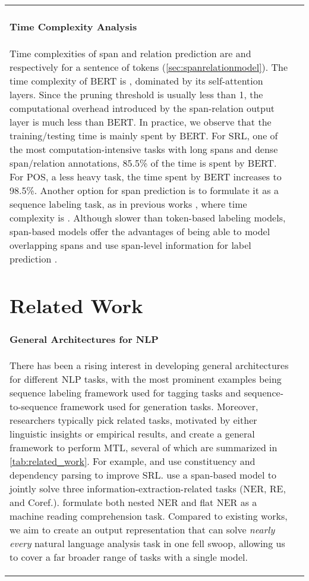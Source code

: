 \documentclass[11pt,a4paper]{article}
\begin{document}
\begin{table*}[tb]
\begin{subtable}[t]{0.47\textwidth}
{\begin{tabular}[t]{ll}
\paragraph{Time Complexity Analysis}
Time complexities of span and relation prediction are  and  respectively for a sentence of  tokens (\autoref{sec:spanrelationmodel}).
The time complexity of BERT is , dominated by its  self-attention layers.
Since the pruning threshold  is usually less than 1, the computational overhead introduced by the span-relation output layer is much less than BERT.
In practice, we observe that the training/testing time is mainly spent by BERT. For SRL, one of the most computation-intensive tasks with long spans and dense span/relation annotations, 85.5\% of the time is spent by BERT. For POS, a less heavy task, the time spent by BERT increases to 98.5\%.
Another option for span prediction is to formulate it as a sequence labeling task, as in previous works \citep{lample:16:ner,he-etal-2017-deep}, where time complexity is . Although slower than token-based labeling models, span-based models offer the advantages of being able to model overlapping spans and use span-level information for label prediction \citep{lee:17:e2ecoref}.

\section{Related Work}\label{sec:related}

\paragraph{General Architectures for NLP}
There has been a rising interest in developing general architectures for different NLP tasks, with the most prominent examples being sequence labeling framework \citep{collobert:11:nlpscratch,ma:16:lstmcnncrf} used for tagging tasks and sequence-to-sequence framework \citep{sutskever:14:seq2seq} used for generation tasks.
Moreover, researchers typically pick related tasks, motivated by either linguistic insights or empirical results, and create a general framework to perform MTL, several of which are summarized in \autoref{tab:related_work}.
For example, \citet{swayamdipta-etal-2018-syntactic} and \citet{strubell-etal-2018-linguistically} use constituency and dependency parsing to improve SRL.
\citet{luan:18:mtlie,luan-etal-2019-general,wadden-etal-2019-entity} use a span-based model to jointly solve three information-extraction-related tasks (NER, RE, and Coref.).
\citet{li-2019-mrcner} formulate both nested NER and flat NER as a machine reading comprehension task.
Compared to existing works, we aim to create an output representation that can solve \emph{nearly every} natural language analysis task in one fell swoop, allowing us to cover a far broader range of tasks with a single model.


\end{tabular}}
\end{subtable}
\end{table*}
\end{document}
